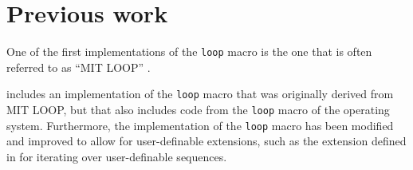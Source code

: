\section{Previous work}

One of the first implementations of the \commonlisp{} \texttt{loop}
macro is the one that is often referred to as ``MIT LOOP''
\cite{Burke:Moon:MIT.loop}.

\sbcl{} includes an implementation of the \texttt{loop} macro that was
originally derived from MIT LOOP, but that also includes code from the
\texttt{loop} macro of the \genera{} operating system.  Furthermore,
the \sbcl{} implementation of the \texttt{loop} macro has been
modified and improved to allow for user-definable extensions, such as
the extension defined in \cite{Rhodes:2007:USC:1622123.1622138} for
iterating over user-definable sequences.
